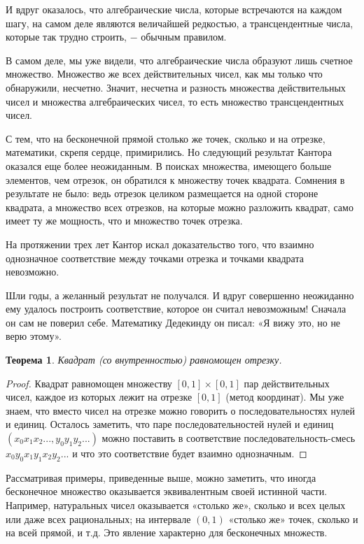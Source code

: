 \documentclass{article}
\newtheorem{theorem}{Теорема}[section]
\begin{document}
И вдруг оказалось, что алгебраические числа, которые встречаются на каждом шагу, на самом деле являются величайшей редкостью, а трансцендентные числа, которые так трудно строить, \(-\) обычным правилом.

В самом деле, мы уже видели, что алгебраические числа образуют лишь счетное множество. Множество же всех действительных чисел, как мы только что обнаружили, несчетно. Значит, несчетна и разность множества действительных чисел и множества алгебраических чисел, то есть множество трансцендентных чисел. \newline

С тем, что на бесконечной прямой столько же точек, сколько и на отрезке, математики, скрепя сердце, примирились. Но следующий результат Кантора оказался еще более неожиданным. В поисках множества, имеющего больше элементов, чем отрезок, он обратился к множеству точек квадрата. Сомнения в результате не было: ведь отрезок целиком размещается на одной стороне квадрата, а множество всех отрезков, на которые можно разложить квадрат, само имеет ту же мощность, что и множество точек отрезка.

На протяжении трех лет Кантор искал доказательство того, что взаимно однозначное соответствие между точками отрезка и точками квадрата невозможно.

Шли годы, а желанный результат не получался. И вдруг совершенно неожиданно ему удалось построить соответствие, которое он считал невозможным! Сначала он сам не поверил себе. Математику Дедекинду он писал: «Я вижу это, но не верю этому».

\begin{theorem}
Квадрат (со внутренностью) равномощен отрезку.
\end{theorem}

\begin{proof}
Квадрат равномощен множеству \([0, 1] \times [0, 1]\) пар действительных чисел, каждое из которых лежит на отрезке \([0, 1]\) (метод координат). Мы уже знаем, что вместо чисел на отрезке можно говорить о последовательностях нулей и единиц. Осталось заметить, что паре последовательностей нулей и единиц \((x_0x_1x_2..., y_0y_1y_2...)\) можно поставить в соответствие последовательность-смесь \(x_0y_0x_1y_1x_2y_2...\) и что это соответствие будет взаимно однозначным.
\end{proof}

Рассматривая примеры, приведенные выше, можно заметить, что иногда бесконечное множество оказывается эквивалентным своей истинной части. Например, натуральных чисел оказывается «столько же», сколько и всех целых или даже всех рациональных; на интервале \((0, 1)\) «столько же» точек, сколько и на всей прямой, и т.д. Это явление характерно для бесконечных множеств.
\end{document}
